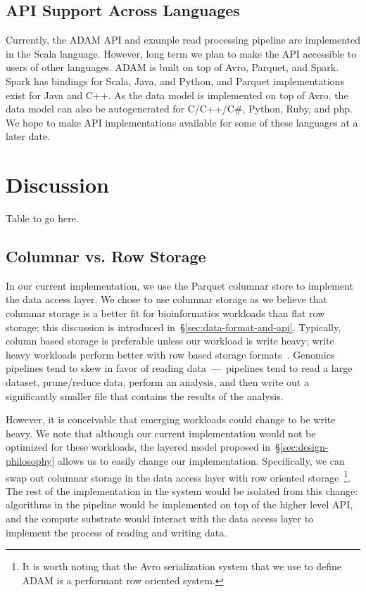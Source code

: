 \documentclass[10pt,twocolumn]{article}
\begin{document}
\subsection{API Support Across Languages}
\label{sec:api-support-across-languages}

Currently, the ADAM API and example read processing pipeline are implemented in the Scala language. However, long
term we plan to make the API accessible to users of other languages. ADAM is built on top of Avro, Parquet, and Spark.
Spark has bindings for Scala, Java, and Python, and Parquet implementations exist for Java and C++. As the data model
is implemented on top of Avro, the data model can also be auto\-generated for C/C++/C\#, Python, Ruby, and php. We hope
to make API implementations available for some of these languages at a later date.

\section{Discussion}
\label{sec:discussion}

Table to go here.

\subsection{Columnar vs. Row Storage}
\label{sec:columnar-vs-row-storage}

In our current implementation, we use the Parquet columnar store to implement the data access layer. We chose to use
columnar storage as we believe that columnar storage is a better fit for bioinformatics workloads than flat row storage;
this discussion is introduced in~\S\ref{sec:data-format-and-api}. Typically, column based storage is preferable unless
our workload is write heavy; write heavy workloads perform better with row based storage formats~\cite{stonebraker05}.
Genomics pipelines tend to skew in favor of reading data~---~pipelines tend to read a large dataset, prune/reduce data,
perform an analysis, and then write out a significantly smaller file that contains the results of the analysis.

However, it is conceivable that emerging workloads could change to be write heavy. We note that although our current
implementation would not be optimized for these workloads, the layered model proposed in~\S\ref{sec:design-philosophy}
allows us to easily change our implementation. Specifically, we can swap out columnar storage in the data access layer with
row oriented storage~\footnote{It is worth noting that the Avro serialization system that we use to define ADAM is a performant
row oriented system.}. The rest of the implementation in the system would be isolated from this change: algorithms in the
pipeline would be implemented on top of the higher level API, and the compute substrate would interact with the data access
layer to implement the process of reading and writing data. 
\end{document}
